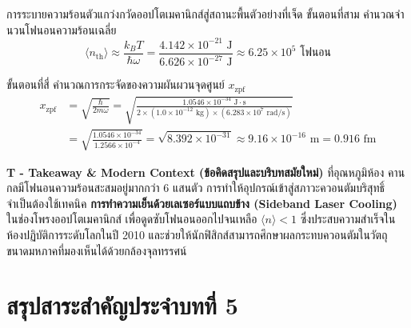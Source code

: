 \begin{psctbox}{การระบายความร้อนตัวแกว่งกวัดออปโตเมคานิกส์สู่สถานะพื้น}{ตัวอย่างที่เจ็ด}
ขั้นตอนที่สาม คำนวณจำนวนโฟนอนความร้อนเฉลี่ย
\begin{equation}
\langle n_{\text{th}} \rangle \approx \frac{k_B T}{\hbar\omega} = \frac{4.142 \times 10^{-21}\text{ J}}{6.626 \times 10^{-27}\text{ J}} \approx 6.25 \times 10^5 \text{ โฟนอน}
\end{equation}

ขั้นตอนที่สี่ คำนวณการกระจัดของความผันผวนจุดศูนย์ $x_{\text{zpf}}$
\begin{align}
x_{\text{zpf}} &= \sqrt{\frac{\hbar}{2m\omega}} = \sqrt{\frac{1.0546 \times 10^{-34}\text{ J}\cdot\text{s}}{2 \times (1.0 \times 10^{-12}\text{ kg}) \times (6.283 \times 10^7\text{ rad/s})}} \\
&= \sqrt{\frac{1.0546 \times 10^{-34}}{1.2566 \times 10^{-4}}} = \sqrt{8.392 \times 10^{-31}} \approx 9.16 \times 10^{-16}\text{ m} = 0.916\text{ fm}
\end{align}

\vspace{6pt}
\noindent\textbf{T - Takeaway \& Modern Context (ข้อคิดสรุปและบริบทสมัยใหม่)} ที่อุณหภูมิห้อง คานกลมีโฟนอนความร้อนสะสมอยู่มากกว่า 6 แสนตัว การทำให้อุปกรณ์เข้าสู่สภาวะควอนตัมบริสุทธิ์จำเป็นต้องใช้เทคนิค \textbf{การทำความเย็นด้วยเลเซอร์แบบแถบข้าง (Sideband Laser Cooling)} ในช่องโพรงออปโตเมคานิกส์ เพื่อดูดซับโฟนอนออกไปจนเหลือ $\langle n \rangle < 1$ ซึ่งประสบความสำเร็จในห้องปฏิบัติการระดับโลกในปี 2010 และช่วยให้นักฟิสิกส์สามารถศึกษาผลกระทบควอนตัมในวัตถุขนาดมหภาคที่มองเห็นได้ด้วยกล้องจุลทรรศน์
\end{psctbox}

\section{สรุปสาระสำคัญประจำบทที่ 5}
\label{sec_chapter_summary_ch05}

